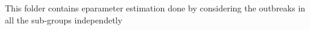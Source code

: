 This folder contains eparameter estimation done by considering the outbreaks in all the sub-groups independetly 
